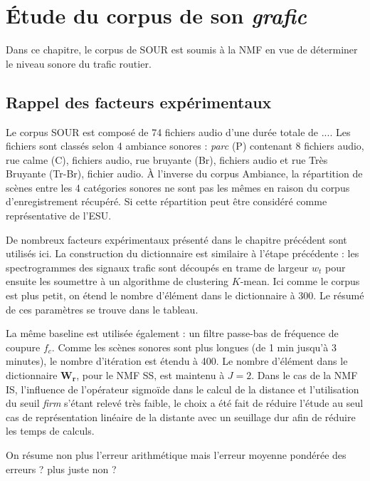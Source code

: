 
\chapter{\'Etude du corpus de son \textit{grafic}}

Dans ce chapitre, le corpus de SOUR est soumis à la NMF en vue de déterminer le niveau sonore du trafic routier. 

\section{Rappel des facteurs expérimentaux}

Le corpus SOUR est composé de 74 fichiers audio d'une durée totale de .... Les fichiers sont classés selon 4 ambiance sonores : \textit{parc} (P) contenant 8 fichiers audio, rue calme (C), fichiers audio, rue bruyante (Br), fichiers audio et rue Très Bruyante (Tr-Br), fichier audio. 
À l'inverse du corpus Ambiance, la répartition de scènes entre les 4 catégories sonores ne sont pas les mêmes en raison du corpus d'enregistrement récupéré. Si cette répartition peut être considéré comme représentative de l'ESU.


De nombreux facteurs expérimentaux présenté dans le chapitre précédent sont utilisés ici.
La construction du dictionnaire est similaire à l'étape précédente : les spectrogrammes des signaux trafic sont découpés en trame de largeur $w_t$ pour ensuite les soumettre à un algorithme de clustering $K$-mean. Ici comme le corpus est plus petit, on étend le nombre d'élément dans le dictionnaire à 300. Le résumé de ces paramètres se trouve dans le tableau.

La même baseline est utilisée également : un filtre passe-bas de fréquence de coupure $f_c$.
Comme les scènes sonores sont plus longues (de 1 min jusqu'à 3 minutes), le nombre d'itération est étendu à 400. 
Le nombre d'élément dans le dictionnaire $\mathbf{W_r}$, pour le NMF SS, est maintenu à $J = 2$.
Dans le cas de la NMF IS, l'influence de l'opérateur sigmoïde dans le calcul de la distance et l'utilisation du seuil \textit{firm} s'étant relevé très faible, le choix a été fait de réduire l'étude au seul cas de représentation linéaire de la distante avec un seuillage dur afin de réduire les temps de calculs. 

On résume non plus l'erreur arithmétique mais l'erreur moyenne pondérée des erreurs ? plus juste non ? 


